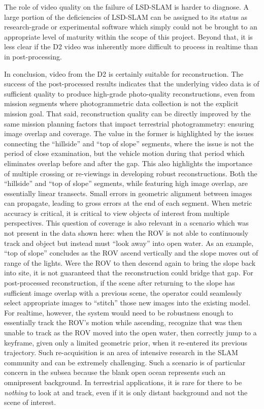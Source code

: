 \documentclass[letterpaper,12pt]{article}
\begin{document}
The role of video quality on the failure of LSD-SLAM is harder to diagnose.   A large portion of the deficiencies of LSD-SLAM can be assigned to its status as research-grade or experimental software which simply could not be brought to an appropriate level of maturity within the scope of this project.     Beyond that, it is less clear if the D2 video was inherently more difficult to process in realtime than in post-processing.

In conclusion, video from the D2 is certainly suitable for reconstruction.   The success of the post-processed results indicates that the underlying video data is of sufficient quality to produce high-grade photo-quality reconstructions, even from mission segments where photogrammetric data collection is not the explicit mission goal.   That said, reconstruction quality can be directly improved by the same mission planning factors that impact terrestrial photogrammetry:   ensuring image overlap and coverage.   The value in the former is highlighted by the issues connecting the ``hillside'' and ``top of slope'' segments, where the issue is not the period of close examination, but the vehicle motion during that period which eliminates overlap before and after the gap.   This also highlights the importance of multiple crossing or re-viewings in developing robust reconstructions.   Both the ``hillside'' and ``top of slope'' segments, while featuring high image overlap, are essentially linear transects.   Small errors in geometric alignment between images can propagate, leading to gross errors at the end of each segment.   When metric accuracy is critical, it is critical to view objects of interest from multiple perspectives.   This question of coverage is also relevant in a scenario which was not present in the data shown here: when the ROV is not able to continuously track and object but instead must ``look away'' into open water.  As an example, ``top of slope'' concludes as the ROV ascend vertically and the slope moves out of range of the lights.     Were the ROV to then descend again to bring the slope back into site, it is not guaranteed that the reconstruction could bridge that gap.   For post-processed reconstruction, if the scene after returning to the slope has sufficient image overlap with a previous scene, the operator could seamlessly select appropriate images to ``stitch'' those new images into the existing model.    For realtime, however, the system would need to be robustness enough to essentially track the ROV's motion while ascending, recognize that was then unable to track as the ROV moved into the open water, then correctly jump to a  keyframe, given only a limited geometric prior, when it re-entered its previous trajectory.  Such re-acquisition is an area of intensive research in the SLAM community and can be extremely challenging.    Such a scenario is of particular concern in the subsea because the blank open ocean represents such an omnipresent background.   In terrestrial applications, it is rare for there to be \textit{nothing} to look at and track, even if it is only distant background and not the scene of interest.
\end{document}
